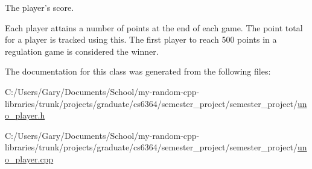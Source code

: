 \-The player's score. 

\-Each player attains a number of points at the end of each game. \-The point total for a player is tracked using this. \-The first player to reach 500 points in a regulation game is considered the winner. 

\-The documentation for this class was generated from the following files\-:\begin{DoxyCompactItemize}
\item 
\-C\-:/\-Users/\-Gary/\-Documents/\-School/my-\/random-\/cpp-\/libraries/trunk/projects/graduate/cs6364/semester\-\_\-project/semester\-\_\-project/\hyperlink{uno__player_8h}{uno\-\_\-player.\-h}\item 
\-C\-:/\-Users/\-Gary/\-Documents/\-School/my-\/random-\/cpp-\/libraries/trunk/projects/graduate/cs6364/semester\-\_\-project/semester\-\_\-project/\hyperlink{uno__player_8cpp}{uno\-\_\-player.\-cpp}\end{DoxyCompactItemize}
